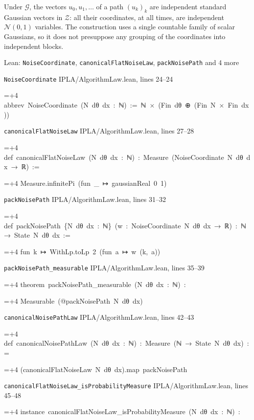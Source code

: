 \documentclass[11pt,a4paper]{report}
\newlength{\leancharwidth}
\newenvironment{leancode}{\par\smallskip\begingroup\ttfamily\footnotesize\raggedright
  \settowidth{\leancharwidth}{M}\setlength{\parskip}{0pt}\setlength{\parindent}{0pt}
  \frenchspacing}{\par\endgroup\smallskip}
\newcommand{\leanline}[2]{\hangindent=\dimexpr#1\leancharwidth+4\leancharwidth\relax
  \hangafter=1\noindent\hspace*{#1\leancharwidth}#2\par}
\newcommand{\leansource}[1]{\par{\footnotesize\color{leanmuted}#1}\par}
\begin{document}
Under \(\mathcal G\), the vectors \(u_0,u_1,\dots\) of a path \((u_k)_k\) are independent standard Gaussian vectors in \(\mathcal Z\): all their coordinates, at all times, are independent \(\mathcal N(0,1)\) variables. The construction uses a single countable family of scalar Gaussians, so it does not presuppose any grouping of the coordinates into independent blocks.

\begin{leanbox}{Lean: \texttt{NoiseCoordinate}, \texttt{canonicalFlatNoiseLaw}, \texttt{packNoisePath} and 4 more}
\leansource{\texttt{NoiseCoordinate} \quad IPLA/\allowbreak{}AlgorithmLaw.lean, lines 24–24}
\begin{leancode}
\leanline{0}{abbrev\ NoiseCoordinate\ (N\ dθ\ dx\ :\ ℕ)\ :=\ ℕ\ ×\ (Fin\ dθ\ ⊕\ (Fin\ N\ ×\ Fin\ dx))}
\end{leancode}
\leansource{\texttt{canonicalFlatNoiseLaw} \quad IPLA/\allowbreak{}AlgorithmLaw.lean, lines 27–28}
\begin{leancode}
\leanline{0}{def\ canonicalFlatNoiseLaw\ (N\ dθ\ dx\ :\ ℕ)\ :\ Measure\ (NoiseCoordinate\ N\ dθ\ dx\ →\ ℝ)\ :=}
\leanline{2}{Measure.infinitePi\ (fun\ \_\ ↦\ gaussianReal\ 0\ 1)}
\end{leancode}
\leansource{\texttt{packNoisePath} \quad IPLA/\allowbreak{}AlgorithmLaw.lean, lines 31–32}
\begin{leancode}
\leanline{0}{def\ packNoisePath\ \{N\ dθ\ dx\ :\ ℕ\}\ (w\ :\ NoiseCoordinate\ N\ dθ\ dx\ →\ ℝ)\ :\ ℕ\ →\ State\ N\ dθ\ dx\ :=}
\leanline{2}{fun\ k\ ↦\ WithLp.toLp\ 2\ (fun\ a\ ↦\ w\ (k,\ a))}
\end{leancode}
\leansource{\texttt{packNoisePath\_\allowbreak{}measurable} \quad IPLA/\allowbreak{}AlgorithmLaw.lean, lines 35–39}
\begin{leancode}
\leanline{0}{theorem\ packNoisePath\_measurable\ (N\ dθ\ dx\ :\ ℕ)\ :}
\leanline{4}{Measurable\ (@packNoisePath\ N\ dθ\ dx)}
\end{leancode}
\leansource{\texttt{canonicalNoisePathLaw} \quad IPLA/\allowbreak{}AlgorithmLaw.lean, lines 42–43}
\begin{leancode}
\leanline{0}{def\ canonicalNoisePathLaw\ (N\ dθ\ dx\ :\ ℕ)\ :\ Measure\ (ℕ\ →\ State\ N\ dθ\ dx)\ :=}
\leanline{2}{(canonicalFlatNoiseLaw\ N\ dθ\ dx).map\ packNoisePath}
\end{leancode}
\leansource{\texttt{canonicalFlatNoiseLaw\_\allowbreak{}isProbabilityMeasure} \quad IPLA/\allowbreak{}AlgorithmLaw.lean, lines 45–48}
\begin{leancode}
\leanline{0}{instance\ canonicalFlatNoiseLaw\_isProbabilityMeasure\ (N\ dθ\ dx\ :\ ℕ)\ :}

\end{leancode}
\end{leanbox}
\end{document}
